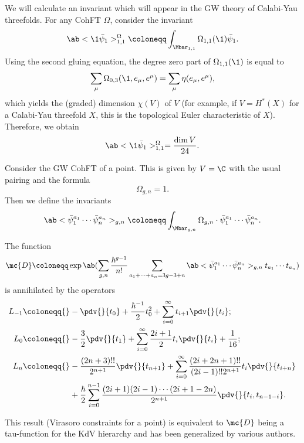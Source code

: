 \begin{exm}
    We will calculate an invariant which will appear in the GW theory of Calabi-Yau threefolds. For any CohFT $\Omega$, consider the invariant
    \[ \ab<\1\bar{\psi}_1>_{1,1}^{\Omega}\coloneqq \int_{\Mbar_{1,1}} \Omega_{1,1}(\1)\bar{\psi}_1. \]
    Using the second gluing equation, the degree zero part of $\Omega_{1,1}(\1)$ is equal to
    \[ \sum_{\mu} \Omega_{0,3}(\1, e_{\mu}, e^{\mu}) = \sum_{\mu} \eta(e_{\mu}, e^{\mu}), \]
    which yields the (graded) dimension $\chi(V)$ of $V$ (for example, if \(V = H^*(X)\) for a Calabi-Yau threefold \(X\), this is the topological Euler characteristic of \(X\)). Therefore, we obtain
    \[ \ab<\1\bar{\psi}_1>_{1,1}^{\Omega} = \frac{\dim V}{24}. \]
\end{exm}

\begin{exm}
    Consider the GW CohFT of a point. This is given by $V = \C$ with the usual pairing and the formula 
    \[ \Omega_{g,n} = 1. \]
    Then we define the invariants
    \[ \ab<\bar{\psi}_1^{a_1} \cdots \bar{\psi}_n^{a_n}>_{g,n} \coloneqq \int_{\Mbar_{g,n}} \Omega_{g,n} \cdot \bar{\psi}_1^{a_1} \cdots \bar{\psi}_n^{a_n}. \]
    \begin{thm}
        The function
        \[ \mc{D} \coloneqq \exp \ab(\sum_{g,n} \frac{\hbar^{g-1}}{n!}\sum_{a_1 + \cdots + a_n = 3g-3+n} \ab<\bar{\psi}_1^{a_1} \cdots \bar{\psi}_n^{a_n}>_{g,n} t_{a_1}\cdots t_{a_n}) \]
        is annihilated by the operators
        \begin{align*}
            L_{-1} \coloneqq{}& -\pdv{}{t_0} + \frac{\hbar^{-1}}{2} t_0^2 + \sum_{i=0}^{\infty} t_{i+1} \pdv{}{t_i};\\
            L_0 \coloneqq{}& -\frac{3}{2} \pdv{}{t_1} + \sum_{i=0}^{\infty} \frac{2i+1}{2} t_i \pdv{}{t_i} + \frac{1}{16};\\
            L_n \coloneqq{}& -\frac{(2n+3)!!}{2^{n+1}} \pdv{}{t_{n+1}} + \sum_{i=0}^{\infty} \frac{(2i+2n+1)!!}{(2i-1)!! 2^{n+1}} t_i \pdv{}{t_{i+n}} \\
            &+ \frac{\hbar}{2} \sum_{i=0}^{n-1} \frac{(2i+1) (2i-1) \cdots (2i+1-2n)}{2^{n+1}} \pdv{}{t_i,t_{n-1-i}}.
        \end{align*}
    \end{thm}
\end{exm}

\begin{rmk}
    This result (Virasoro constraints for a point) is equivalent to $\mc{D}$ being a tau-function for the KdV hierarchy and has been generalized by various authors.
\end{rmk}



